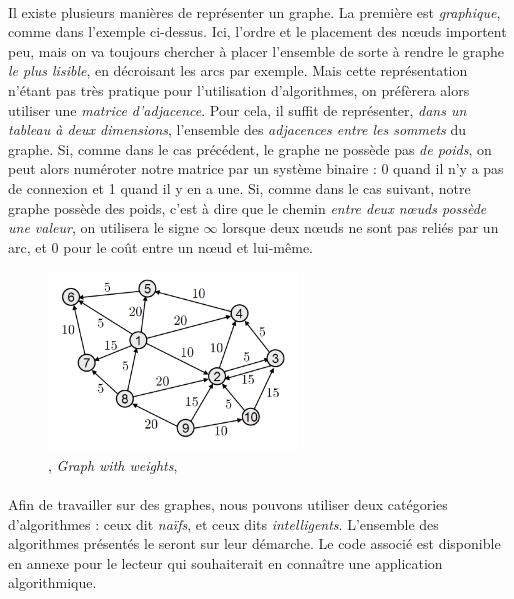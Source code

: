 \paragraph{} Il existe plusieurs manières de représenter un graphe. La première est \emph{graphique}, comme dans 
l'exemple ci-dessus. Ici, l'ordre et le placement des n\oe{}uds importent peu, mais on va toujours chercher à placer
l'ensemble de sorte à rendre le graphe \emph{le plus lisible}, en décroisant les arcs par exemple. Mais cette représentation
n'étant pas très pratique pour l'utilisation d'algorithmes, on préfèrera alors utiliser une \emph{matrice d'adjacence}.
Pour cela, il suffit de représenter, \emph{dans un tableau à deux dimensions}, l'ensemble des \emph{adjacences entre les
sommets} du graphe. Si, comme dans le cas précédent, le graphe ne possède pas \emph{de poids}, on peut alors numéroter
notre matrice par un système binaire : 0 quand il n'y a pas de connexion et 1 quand il y en a une. Si, comme dans le cas
suivant, notre graphe possède des poids, c'est à dire que le chemin \emph{entre deux n\oe{}uds possède une valeur}, on
utilisera le signe $\infty$ lorsque deux n\oe{}uds ne sont pas reliés par un arc, et 0 pour le coût entre un n\oe{}ud et
lui-même.

\begin{figure}[h]
    \centering
    \includegraphics[width=250px]{chapters/03/images/weighted_graph.png}
    \caption{\label{weighted_graph}, \emph{Graph with weights}, \cite{GraphTheory1}}
\end{figure}

\paragraph{} Afin de travailler sur des graphes, nous pouvons utiliser deux catégories d'algorithmes : ceux dit \emph{naïfs},
et ceux dits \emph{intelligents}. L'ensemble des algorithmes présentés le seront sur leur démarche. Le code associé est
disponible en annexe pour le lecteur qui souhaiterait en connaître une application algorithmique.

